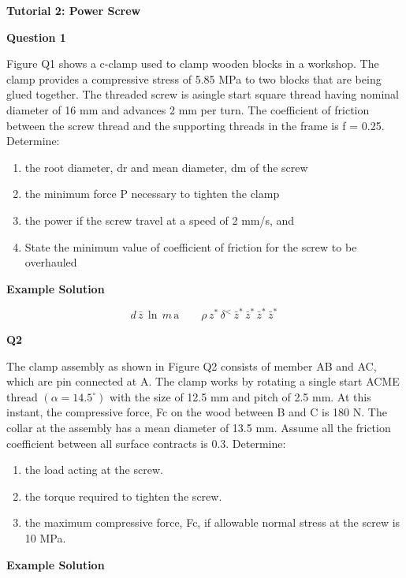 \documentclass[a4paper]{article}
\begin{document}
\textbf{Tutorial 2: Power Screw}
\vspace{10pt}

\textbf{Question 1}

Figure Q1 shows a c-clamp used to clamp wooden blocks in a workshop. The clamp provides a compressive stress of 5.85 MPa to two blocks that are being glued together. The threaded screw is asingle start square thread having nominal diameter of 16 mm and advances 2 mm per turn. The coefficient of friction between the screw thread and the supporting threads in the frame is f = 0.25.
Determine:
\begin{enumerate}[label=(\roman*)]
    \item the root diameter, dr and mean diameter, dm of the screw
    \item the minimum force P necessary to tighten the clamp
    \item the power if the screw travel at a speed of 2 mm/s, and
    \item State the minimum value of coefficient of friction for the screw to be overhauled
\end{enumerate}

\textbf{Example Solution}

$${{d\,\bar{z}\,\ln\,m\,\mathrm{a}\qquad\rho\,z^{*}\,\delta^{<}\,\bar{z}^{*}\,\bar{z}^{*}\,\bar{z}^{*}\,\bar{z}^{*}\,}}$$

\newpage
\textbf{Q2}

The clamp assembly as shown in Figure Q2 consists of member AB and AC, which are pin connected at A. The clamp works by rotating a single start ACME thread $(\alpha=14.5^{\circ})$ with the size of 12.5 mm and pitch of 2.5 mm. At this instant, the compressive force, Fc on the wood between B and C is 180 N. The collar at the assembly has a mean diameter of 13.5 mm. Assume all the friction coefficient between all surface contracts is 0.3. Determine:

\begin{enumerate}[label=(\roman*)]
    \item the load acting at the screw.

    \item the torque required to tighten the screw.

    \item the maximum compressive force, Fc, if allowable normal stress at the screw is 10 MPa.
\end{enumerate}


\textbf{Example Solution}
\end{document}
